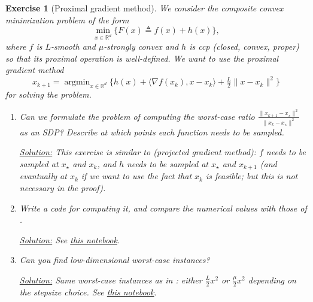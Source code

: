 \documentclass[11pt,a4paper]{article}
\newcommand{\inner}[2]{{\langle #1, #2\rangle}}
\DeclareMathOperator*{\argmin}{argmin}
\newcommand{\correction}[1]{{{\color{blue}\underline{Solution:} #1}}}
\newcommand{\correction}[1]{}
\newtheorem{exercise}{Exercise}
\begin{document}
	\begin{exercise}[Proximal gradient method]\label{ex:pgm} We consider the composite convex minimization problem of the form
	\[ \min_{x\in\mathbb{R}^d} \{F(x)\triangleq f(x)+h(x)\},\]
where $f$ is $L$-smooth and $\mu$-strongly convex and $h$ is ccp (closed, convex, proper) so that its proximal operation is well-defined. We want to use the proximal gradient method
\[ x_{k+1}=\argmin_{x\in\mathbb{R}^d}\{h(x)+\inner{\nabla f(x_k)}{x-x_k}+\tfrac{L}{2}\|x-x_k\|^2\}\]
for solving the problem.
	\begin{enumerate}
	\item Can we formulate the problem of computing the worst-case ratio $\frac{\|x_{k+1}-x_\star\|^2}{\|x_k-x_\star\|^2}$ as an SDP? Describe at which points each function needs to be sampled. 
	
	\correction{This exercise is similar to  (projected gradient method): $f$ needs to be sampled at $x_\star$ and $x_k$, and $h$ needs to be sampled at $x_\star$ and $x_{k+1}$ (and evantually at $x_k$ if we want to use the fact that $x_k$ is feasible; but this is not necessary in the proof).}
	
	\item Write a code for computing it, and compare the numerical values with those of .
	
	\correction{See \href{https://github.com/PerformanceEstimation/Learning-Performance-Estimation/tree/main/Codes/Jupyter/Exercise09.ipynb}{this notebook}.}
	
	\item Can you find low-dimensional worst-case instances?
	
	\correction{Same worst-case instances as in : either $\tfrac{L}{2}x^2$ or $\tfrac{\mu}{2}x^2$ depending on the stepsize choice. See \href{https://github.com/PerformanceEstimation/Learning-Performance-Estimation/tree/main/Codes/Jupyter/Exercise09.ipynb}{this notebook}.}
	\end{enumerate}
	\end{exercise}
\end{document}
